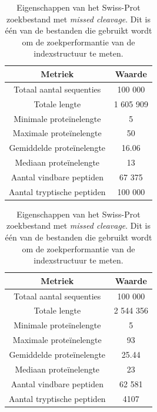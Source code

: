 \documentclass[11pt,dutch,faculty=we,layout=titlefont,underline=false,titleUppercase=true,titleUnderline=true]{ugent2016-report}
\begin{document}
    \begin{table}[!h]
        \begin{minipage}{.5\linewidth}
            \centering
            \begin{tabular}{c c}
                Metriek                    & Waarde    \\
                \hline\hline
                Totaal aantal sequenties   & 100 000   \\
                Totale lengte              & 1 605 909 \\
                Minimale proteïnelengte    & 5         \\
                Maximale proteïnelengte    & 50        \\
                Gemiddelde proteïnelengte  & 16.06     \\
                Mediaan proteïnelengte     & 13        \\
                Aantal vindbare peptiden   & 67 375    \\
                Aantal tryptische peptiden & 100 000   \\
                \hline
            \end{tabular}
            \caption{Eigenschappen van \newline het Swiss-Prot zoekbestand \newline zonder \textit{missed cleavage}. Dit is één van de bestanden die gebruikt wordt om de zoekperformantie van de indexstructuur te meten.}
            \label{tab:swiss_geen_missed_cleavage}
        \end{minipage}
        \begin{minipage}{.5\linewidth}
            \centering
            \begin{tabular}{ c c }
                Metriek                    & Waarde    \\
                \hline\hline
                Totaal aantal sequenties   & 100 000   \\
                Totale lengte              & 2 544 356 \\
                Minimale proteïnelengte    & 5         \\
                Maximale proteïnelengte    & 93        \\
                Gemiddelde proteïnelengte  & 25.44     \\
                Mediaan proteïnelengte     & 23        \\
                Aantal vindbare peptiden   & 62 581    \\
                Aantal tryptische peptiden & 4107      \\
                \hline
            \end{tabular}
            \caption{Eigenschappen van \newline het Swiss-Prot zoekbestand \newline met \textit{missed cleavage}. Dit is één van de bestanden die gebruikt wordt om de zoekperformantie van de indexstructuur te meten.}
            \label{tab:swiss_missed_cleavage}
        \end{minipage}
    \end{table}
\end{document}
